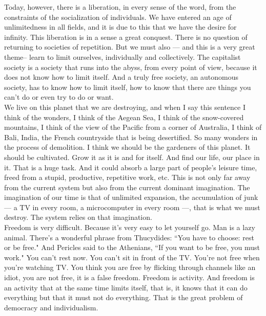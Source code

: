 Today, however, there is a liberation, in every sense of the word, from the constraints of the socialization of individuals. We have entered an age of unlimitedness in all fields, and it is due to this that we have the desire for infinity. This liberation is in a sense a great conquest. There is no question of returning to societies of repetition. But we must also --- and this is a very great theme-- learn to limit ourselves, individually and collectively. The capitalist society is a society that runs into the abyss, from every point of view, because it does not know how to limit itself. And a truly free society, an autonomous society, has to know how to limit itself, how to know that there are things you can't do or even try to do or want.\\
We live on this planet that we are destroying, and when I say this sentence I think of the wonders, I think of the Aegean Sea, I think of the snow-covered mountains, I think of the view of the Pacific from a corner of Australia, I think of Bali, India, the French countryside that is being desertified. So many wonders in the process of demolition. I think we should be the gardeners of this planet. It should be cultivated. Grow it as it is and for itself. And find our life, our place in it. That is a huge task. And it could absorb a large part of people's leisure time, freed from a stupid, productive, repetitive work, etc. This is not only far away from the current system but also from the current dominant imagination. The imagination of our time is that of unlimited expansion, the accumulation of junk --- a TV in every room, a microcomputer in every room ---, that is what we must destroy. The system relies on that imagination.\\
Freedom is very difficult. Because it's very easy to let yourself go. Man is a lazy animal. There's a wonderful phrase from Thucydides: ``You have to choose: rest or be free." And Pericles said to the Athenians, ``If you want to be free, you must work." You can't rest now. You can't sit in front of the TV. You're not free when you're watching TV. You think you are free by flicking through channels like an idiot, you are not free, it is a false freedom. Freedom is activity. And freedom is an activity that at the same time limits itself, that is, it knows that it can do everything but that it must not do everything. That is the great problem of democracy and individualism.



